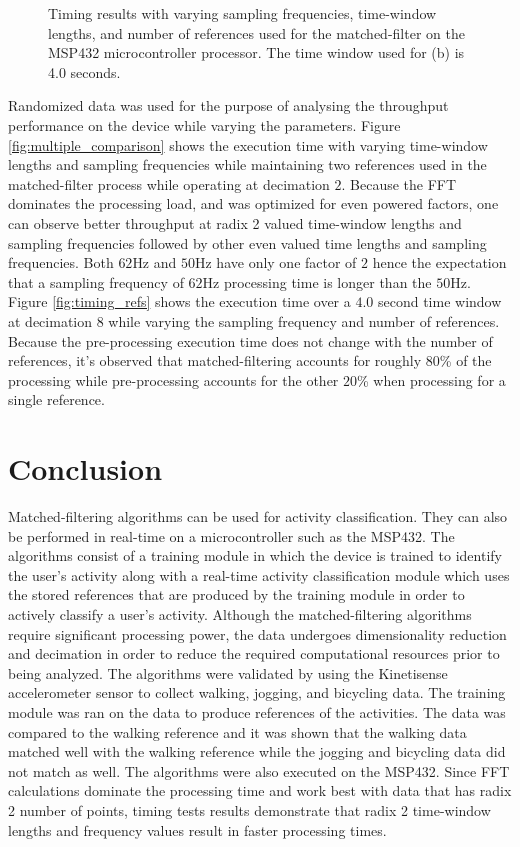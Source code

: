 \documentclass[journal]{IEEEtran}
\begin{document}
\begin{figure}[!ht]
   \centering
   \quad
   \caption{Timing results with varying sampling frequencies, time-window lengths, and number of references used for the matched-filter on the MSP432 microcontroller processor. The time window used for (b) is 4.0 seconds.}
   \label{fig:timing}
\end{figure}
%
Randomized data was used for the purpose of analysing the throughput performance on the device while varying the parameters.
Figure \ref{fig:multiple_comparison} shows the execution time with varying time-window lengths and sampling frequencies while maintaining two references used in the matched-filter process while operating at decimation $2$.
Because the FFT dominates the processing load, and was optimized for even powered factors, one can observe better throughput at radix 2 valued time-window lengths and sampling frequencies followed by other even valued time lengths and sampling frequencies. Both $62$Hz and $50$Hz have only one factor of $2$ hence the expectation that a sampling frequency of $62$Hz processing time is longer than the $50$Hz.
Figure \ref{fig:timing_refs} shows the execution time over a $4.0$ second time window at decimation $8$ while varying the sampling frequency and number of references. Because the pre-processing execution time does not change with the number of references, it's observed that matched-filtering accounts for roughly $80$\% of the processing while pre-processing accounts for the other $20$\% when processing for a single reference.
%
\section{Conclusion}
Matched-filtering algorithms can be used for activity classification.
They can also be performed in real-time on a microcontroller such as the MSP432.
The algorithms consist of a training module in which the device is trained to identify the user’s activity along with a real-time activity classification module which uses the stored references that are produced by the training module in order to actively classify a user’s activity.
Although the matched-filtering algorithms require significant processing power, the data undergoes dimensionality reduction and decimation in order to reduce the required computational resources prior to being analyzed.
The algorithms were validated by using the Kinetisense accelerometer sensor to collect walking, jogging, and bicycling data.
The training module was ran on the data to produce references of the activities.
The data was compared to the walking reference and it was shown that the walking data matched well with the walking reference while the jogging and bicycling data did not match as well.
The algorithms were also executed on the MSP432.
Since FFT calculations dominate the processing time and work best with data that has radix 2 number of points, timing tests results demonstrate that radix 2 time-window lengths and frequency values result in faster processing times.
%
\appendices
%
\ifCLASSOPTIONcaptionsoff
  \newpage
\fi
%


\end{document}
